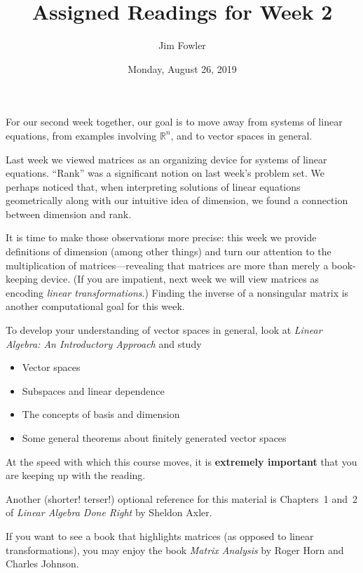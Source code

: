\documentclass{homework}
\author{Jim Fowler}
\title{Assigned Readings for Week 2}
\date{Monday, August 26, 2019}
\begin{document}
\maketitle

For our second week together, our goal is to move away from systems of
linear equations, from examples involving $\mathbb{R}^n$, and to vector
spaces in general.

Last week we viewed matrices as an organizing device for systems of
linear equations.  ``Rank'' was a significant notion on last week's
problem set.  We perhaps noticed that, when interpreting solutions of
linear equations geometrically along with our intuitive idea of
dimension, we found a connection between dimension and rank.

It is time to make those observations more precise: this week we
provide definitions of dimension (among other things) and turn our
attention to the multiplication of matrices---revealing that matrices
are more than merely a book-keeping device.  (If you are impatient,
next week we will view matrices as encoding \textit{linear
  transformations}.)  Finding the inverse of a nonsingular matrix is
another computational goal for this week.

To develop your understanding of vector spaces in general, look at
\textit{Linear Algebra: An Introductory Approach} and study
\begin{itemize}
\item {} Vector spaces
\item {} Subspaces and linear dependence
\item {} The concepts of basis and dimension
\item {} Some general theorems about finitely generated vector spaces
\end{itemize}
At the speed with which this course moves, it is \textbf{extremely
  important} that you are keeping up with the reading.

Another (shorter!  terser!) optional reference for this material is
Chapters~1 and~2 of \textit{Linear Algebra Done Right} by Sheldon
Axler.

If you want to see a book that highlights matrices (as opposed to
linear transformations), you may enjoy the book \textit{Matrix
  Analysis} by Roger Horn and Charles Johnson.
\end{document}
